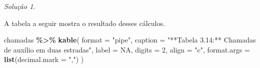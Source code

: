 \documentclass[
]{latex/krantz}
\newenvironment{Shaded}{\begin{snugshade}}{\end{snugshade}}
\newcommand{\AttributeTok}[1]{\textcolor[rgb]{0.13,0.29,0.53}{#1}}
\newcommand{\ConstantTok}[1]{\textcolor[rgb]{0.56,0.35,0.01}{#1}}
\newcommand{\ControlFlowTok}[1]{\textcolor[rgb]{0.13,0.29,0.53}{\textbf{#1}}}
\newcommand{\DecValTok}[1]{\textcolor[rgb]{0.00,0.00,0.81}{#1}}
\newcommand{\FunctionTok}[1]{\textcolor[rgb]{0.13,0.29,0.53}{\textbf{#1}}}
\newcommand{\NormalTok}[1]{#1}
\newcommand{\OtherTok}[1]{\textcolor[rgb]{0.56,0.35,0.01}{#1}}
\newcommand{\SpecialCharTok}[1]{\textcolor[rgb]{0.81,0.36,0.00}{\textbf{#1}}}
\newcommand{\StringTok}[1]{\textcolor[rgb]{0.31,0.60,0.02}{#1}}
\theoremstyle{definition}
\theoremstyle{definition}
\theoremstyle{definition}
\theoremstyle{definition}
\theoremstyle{remark}
\newtheorem*{solution}{Solução}
\begin{document}
\begin{solution}
\begin{Shaded}
\end{Shaded}

A tabela a seguir mostra o resultado desses cálculos.

\begin{Shaded}
\begin{Highlighting}[]
\NormalTok{chamadas }\SpecialCharTok{\%\textgreater{}\%} 
  \FunctionTok{kable}\NormalTok{(}
    \AttributeTok{format =} \StringTok{"pipe"}\NormalTok{,}
    \AttributeTok{caption =} \StringTok{"**Tabela 3.14:** Chamadas de auxílio em duas estradas"}\NormalTok{,}
    \AttributeTok{label =} \ConstantTok{NA}\NormalTok{,}
    \AttributeTok{digits =} \DecValTok{2}\NormalTok{,}
    \AttributeTok{align =} \StringTok{"c"}\NormalTok{,}
    \AttributeTok{format.args =} \FunctionTok{list}\NormalTok{(}\AttributeTok{decimal.mark =} \StringTok{","}\NormalTok{)}
\NormalTok{  )}
\end{Highlighting}
\end{Shaded}


\end{solution}
\end{document}
